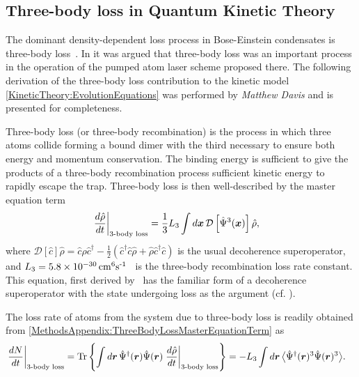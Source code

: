 \subsection{Three-body loss in Quantum Kinetic Theory}
\label{MethodsAppendix:QKT3BodyLoss}

The dominant density-dependent loss process in Bose-Einstein condensates is three-body loss~\citep{Burt:1997fk,Soding:1999}. In  it was argued that three-body loss was an important process in the operation of the pumped atom laser scheme proposed there.  The following derivation of the three-body loss contribution to the kinetic model \eqref{KineticTheory:EvolutionEquations} was performed by \emph{Matthew Davis} and is presented for completeness.

Three-body loss (or three-body recombination) is the process in which three atoms collide forming a bound dimer with the third necessary to ensure both energy and momentum conservation.  The binding energy is sufficient to give the products of a three-body recombination process sufficient kinetic energy to rapidly escape the trap.  Three-body loss is then well-described by the master equation term
\begin{align}
    \left. \frac{d \hat{\rho}}{d t}\right|_\text{3-body loss} &= \frac{1}{3}L_3 \int d \vect{x} \,\mathcal{D} \left[ \hat{\Psi}^3(\vect{x}) \right] \hat{\rho},
    \label{MethodsAppendix:ThreeBodyLossMasterEquationTerm}
\end{align}
where $\mathcal{D}[\hat{c}]\hat{\rho} = \hat{c}\hat{\rho} \hat{c}^\dagger - \frac{1}{2}(\hat{c}^\dagger \hat{c}\hat{\rho} + \hat{\rho} \hat{c}^\dagger \hat{c})$ is the usual decoherence superoperator, and $L_3 = \unit[5.8\times 10^{-30}]{cm\textsuperscript{6}s\textsuperscript{-1}}$~\citep{Burt:1997fk} is the three-body recombination loss rate constant.  This equation, first derived by~\citep{Jack:2002} has the familiar form of a decoherence superoperator with the state undergoing loss as the argument (cf. ). %

The loss rate of atoms from the system due to three-body loss is readily obtained from \eqref{MethodsAppendix:ThreeBodyLossMasterEquationTerm} as
\begin{align}
    \left.\frac{d N}{dt} \right|_\text{3-body loss} &=  \Tr\left\{\int d \vect{r}\,\hat{\Psi}^\dagger(\vect{r})\hat{\Psi}(\vect{r}) \left.\frac{d \hat{\rho}}{dt}\right|_\text{3-body loss} \right\} = - L_3 \int d \vect{r}\, \mean{\hat{\Psi}^\dagger(\vect{r})^3 \hat{\Psi}(\vect{r})^3}.
    \label{MethodsAppendix:ThreeBodyLossNumberLossRate}
\end{align}

